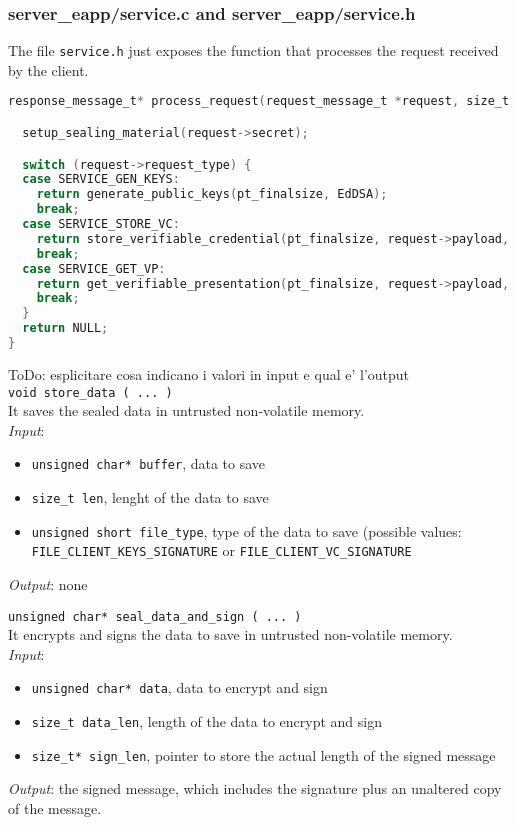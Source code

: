 \subsubsection{server\_eapp/service.c and server\_eapp/service.h}
The file \texttt{service.h} just exposes the function that processes the request received by the client.  
\begin{lstlisting}[language=C,frame=single]
response_message_t* process_request(request_message_t *request, size_t *pt_finalsize) {

  setup_sealing_material(request->secret);

  switch (request->request_type) {
  case SERVICE_GEN_KEYS:
    return generate_public_keys(pt_finalsize, EdDSA);
    break;
  case SERVICE_STORE_VC:
    return store_verifiable_credential(pt_finalsize, request->payload, request->len);
    break;
  case SERVICE_GET_VP:
    return get_verifiable_presentation(pt_finalsize, request->payload, request->len, EdDSA);
    break;
  }
  return NULL;
}
\end{lstlisting}
{\color{red} ToDo: esplicitare cosa indicano i valori in input e qual e' l'output}\\
\noindent
\texttt{void store\_data ( ... )}\\
It saves the sealed data in untrusted non-volatile memory. \\
\textit{Input}:
\begin{itemize}[noitemsep,nolistsep]
  \item \texttt{unsigned char* buffer}, data to save
  \item \texttt{size\_t len}, lenght of the data to save
  \item \texttt{unsigned short file\_type}, type of the data to save (possible values: \texttt{FILE\_CLI\-ENT\_KEYS\_SIGNATURE} or \texttt{FILE\_CLIENT\_VC\_SIGNATURE}\)
\end{itemize}
\textit{Output}: none

\noindent
\texttt{unsigned char* seal\_data\_and\_sign ( ... )}\\
It encrypts and signs the data to save in untrusted non-volatile memory. \\
\textit{Input}:
\begin{itemize}[noitemsep,nolistsep]
  \item \texttt{unsigned char* data}, data to encrypt and sign
  \item \texttt{size\_t data\_len}, length of the data to encrypt and sign
  \item \texttt{size\_t* sign\_len}, pointer to store the actual length of the signed message
\end{itemize}
\textit{Output}: the signed message, which includes the signature plus an unaltered copy of the message. 


